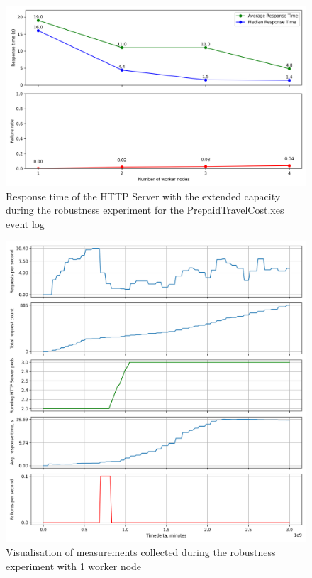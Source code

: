 \documentclass[12pt]{article}
\begin{document}
\begin{figure}
    \centering
    \includegraphics[width=\textwidth]{figures/robustness_experiment.png}
    \caption{Response time of the HTTP Server with the extended capacity during the robustness experiment for the PrepaidTravelCost.xes event log}
    \label{fig:robustness_experiment}
\end{figure}

\begin{figure}[p]
    \centering
    \includegraphics[width=\textwidth]{figures/robustness_1_node.png}
    \caption{Visualisation of measurements collected during the robustness experiment with 1 worker node}
    \label{fig:robustness_1_node}
\end{figure}
\end{document}

